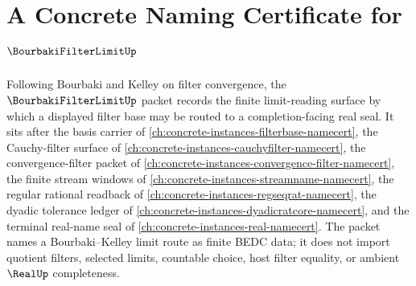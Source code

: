 \chapter{A Concrete Naming Certificate for $\BourbakiFilterLimitUp$}
\label{ch:concrete-instances-bourbaki-filter-limit-namecert}

Following Bourbaki and Kelley on filter convergence, the $\BourbakiFilterLimitUp$ packet records the finite limit-reading surface by which a displayed filter base may be routed to a completion-facing real seal. It sits after the basis carrier of \autoref{ch:concrete-instances-filterbase-namecert}, the Cauchy-filter surface of \autoref{ch:concrete-instances-cauchyfilter-namecert}, the convergence-filter packet of \autoref{ch:concrete-instances-convergence-filter-namecert}, the finite stream windows of \autoref{ch:concrete-instances-streamname-namecert}, the regular rational readback of \autoref{ch:concrete-instances-regseqrat-namecert}, the dyadic tolerance ledger of \autoref{ch:concrete-instances-dyadicratcore-namecert}, and the terminal real-name seal of \autoref{ch:concrete-instances-real-namecert}. The packet names a Bourbaki--Kelley limit route as finite BEDC data; it does not import quotient filters, selected limits, countable choice, host filter equality, or ambient $\RealUp$ completeness.

